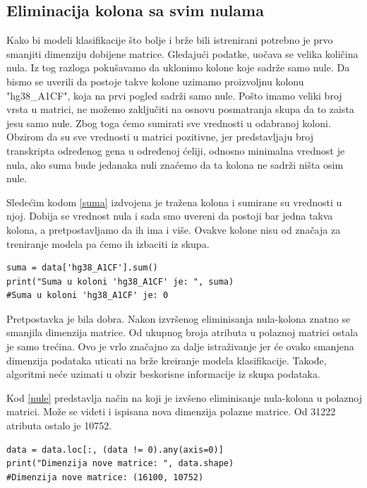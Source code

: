 \documentclass[a4paper]{article}
\begin{document}
\subsection{Eliminacija kolona sa svim nulama}
Kako bi modeli klasifikacije što bolje i brže bili istrenirani potrebno je prvo smanjiti dimenziju dobijene matrice. Gledajući podatke, uočava se velika količina nula. Iz tog razloga pokušavamo da uklonimo kolone koje sadrže samo nule. Da bismo se uverili da postoje takve kolone uzimamo proizvoljnu kolonu "hg38\_A1CF", koja na prvi pogled sadrži samo nule. Pošto imamo veliki broj vrsta u matrici, ne možemo zaključiti na osnovu posmatranja skupa da to zaista jesu samo nule. Zbog toga ćemo sumirati sve vrednosti u odabranoj koloni. Obzirom da su sve vrednosti u matrici pozitivne, jer predstavljaju broj transkripta određenog gena u određenoj ćeliji, odnosno minimalna vrednost je nula, ako suma bude jedanaka nuli znaćemo da ta kolona ne sadrži ništa osim nule. 

Sledećim kodom \ref{suma} izdvojena je tražena kolona i sumirane su vrednosti u njoj. Dobija se vrednost nula i sada smo uvereni da postoji bar jedna takva kolona, a pretpostavljamo da ih ima i više. Ovakve kolone nisu od značaja za treniranje modela pa ćemo ih izbaciti iz skupa.
\\
\begin{lstlisting}[caption={Računanje sume u koloni gena hg38\_A1CF},frame=single, label=suma]
suma = data['hg38_A1CF'].sum()
print("Suma u koloni 'hg38_A1CF' je: ", suma) 
#Suma u koloni 'hg38_A1CF' je: 0
\end{lstlisting}


Pretpostavka je bila dobra. Nakon izvršenog eliminisanja nula-kolona znatno se smanjila dimenzija matrice. Od ukupnog broja atributa u polaznoj matrici ostala je samo trećina. Ovo je vrlo značajno za dalje istraživanje jer će ovako smanjena dimenzija podataka uticati na brže kreiranje modela klasifikacije. Takođe, algoritmi neće uzimati u obzir beskorisne informacije iz skupa podataka.

Kod \ref{nule} predstavlja način na koji je izvšeno eliminisanje nula-kolona u polaznoj matrici. Može se videti i ispisana nova dimenzija polazne matrice. Od 31222 atributa ostalo je 10752.
\\
\begin{lstlisting}[caption={Eliminacija nula-kolona},frame=single, label=nule]
data = data.loc[:, (data != 0).any(axis=0)]
print("Dimenzija nove matrice: ", data.shape) 
#Dimenzija nove matrice: (16100, 10752)
\end{lstlisting}
\end{document}

